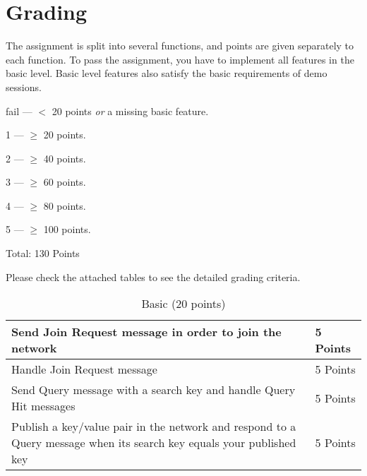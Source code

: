 \documentclass[12pt, a4paper]{article}
\begin{document}
\section{Grading}
The assignment is split into several functions, and points are given separately to each function.
To pass the assignment, you have to implement all features in the basic level.
Basic level features also satisfy the basic requirements of demo sessions.

\vskip 20pt

fail --- $<$ 20 points \emph{or} a missing basic feature.

1 --- $\ge$ 20 points.

2 --- $\ge$  40 points.

3 --- $\ge$ 60 points.

4 --- $\ge$ 80 points.

5 --- $\ge$  100 points.

\vskip 20pt

Total: 130 Points

Please check the attached tables to see the detailed grading criteria.

\begin{table}[htdp]
\caption{Basic (20 points)}
\begin{center}
\begin{tabular}{|p{12cm}|p{2cm}|}
\hline
Send Join Request message in order to join the network & 5 Points \\
\hline
Handle Join Request message & 5 Points\\
\hline
Send Query message with a search key and handle Query Hit messages & 5 Points  \\
\hline
Publish a key/value pair in the network and respond to a Query message when its search key equals your published key & 5 Points \\
\hline
\end{tabular}
\end{center}
\end{table}
\end{document}
